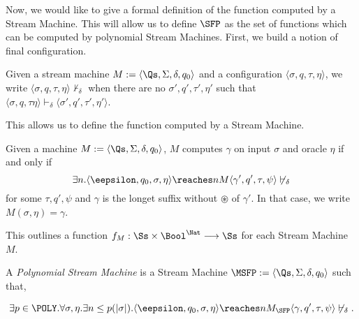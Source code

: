   \begin{conditional}{\notappendix}

    Now, we would like to give a formal definition of the function computed
    by a Stream Machine. This will allow us to define $\SFP$ as the set of
    functions which can be
    computed by polynomial Stream Machines.
    First, we build a notion of final configuration.

    \begin{notation}
      \label{notation:smfin}
    Given a stream machine $M:=\langle\Qs,\Sigma,
    \delta, q_0\rangle$
    and a configuration
    $\langle \sigma, q,\tau,\eta\rangle$,
    we write $\langle\sigma,q,\tau,\eta\rangle
    \not\vdash_{\delta}$ when there are no
    $\sigma',
    q',\tau',\eta'$ such that $\langle \sigma,q,\tau\eta\rangle
    \vdash_{\delta}\langle
    \sigma',q',\tau',\eta'\rangle$.
    \end{notation}

    This allows us to define the function computed by a Stream Machine.

    \begin{defn}
      \label{def:smval}
    Given a machine
    $M:=\langle \Qs,\Sigma,\delta,q_0\rangle$,
    $M$ computes $\gamma$ on input $\sigma$
    and oracle $\eta$ if and only if
    $$
    \exists n.\langle \eepsilon, q_0,\sigma, \eta\rangle
    \reaches n M
    \langle \gamma', q', \tau, \psi\rangle \not\vdash_{\delta}
    $$
    for some $\tau,q',\psi$ and $\gamma$ is the longet suffix
    without $\circledast$ of $\gamma'$.
    In that case, we write $M(\sigma,\eta)=\gamma$.
    \end{defn}

    This outlines a function $f_M: \Ss \times \Bool^\Nat \longrightarrow \Ss$
    for each Stream Machine $M$.

    \begin{defn}
      \label{def:sfpmachine}
    A \emph{Polynomial Stream Machine}
    is a Stream Machine $\MSFP :=
    \langle \Qs,\Sigma,\delta,q_0\rangle$
    such that,

    $$
    \exists p \in \POLY.\forall \sigma, \eta.
    \exists n\le p(|\sigma|).
    \langle \eepsilon, q_0,\sigma, \eta\rangle
    \reaches n {M_{\SFP}} \langle \gamma,
    q', \tau, \psi\rangle \not \vdash_{\delta}.
    $$
    \end{defn}


\end{conditional}
